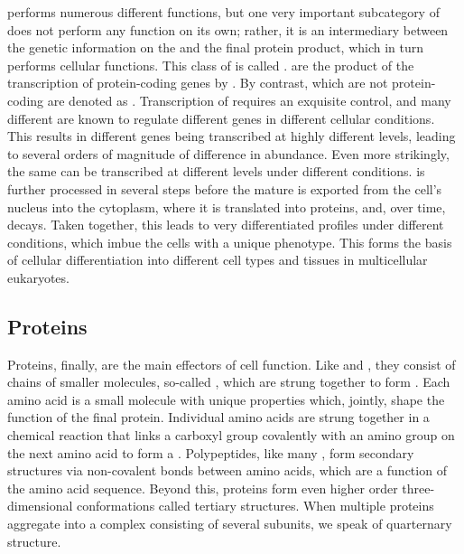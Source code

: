 \rna performs numerous different functions, but one very important subcategory
of \rna does not perform any function on its own; rather, it is an intermediary
between the genetic information on the \dna and the final protein product, which
in turn performs cellular functions. This class of \rna is called \mrna.
\mrna[s] are the product of the transcription of protein-coding genes by .
By contrast, \rna[s] which are not protein-coding are denoted as \ncrna.
Transcription of \mrna requires an exquisite control, and many different \tf[s]
are known to regulate different genes in different cellular conditions. This
results in different \mrna genes being transcribed at highly different levels,
leading to several orders of magnitude of difference in \mrna abundance. Even
more strikingly, the same \mrna can be transcribed at different levels under
different conditions. \mrna is further processed in several steps before the
mature \mrna is exported from the cell’s nucleus into the cytoplasm, where it is
translated into proteins, and, over time, decays. Taken together, this leads to
very differentiated \mrna profiles under different conditions, which imbue the
cells with a unique phenotype. This forms the basis of cellular differentiation
into different cell types and tissues in multicellular eukaryotes.

\subsection{Proteins}

Proteins, finally, are the main effectors of cell function. Like \dna and \rna,
they consist of chains of smaller molecules, so-called
, which are strung together to form
. Each amino acid is a small molecule with unique
properties which, jointly, shape the function of the final protein. Individual
amino acids are strung together in a chemical reaction that links a carboxyl
group covalently with an amino group on the next amino acid to form a
\citep{Alberts:2002}. Polypeptides, like many \rna[s], form secondary structures
via non-covalent bonds between amino acids, which are a function of the amino
acid sequence. Beyond this, proteins form even higher order three-dimensional
conformations called tertiary structures. When multiple proteins aggregate into
a complex consisting of several subunits, we speak of quarternary structure.

